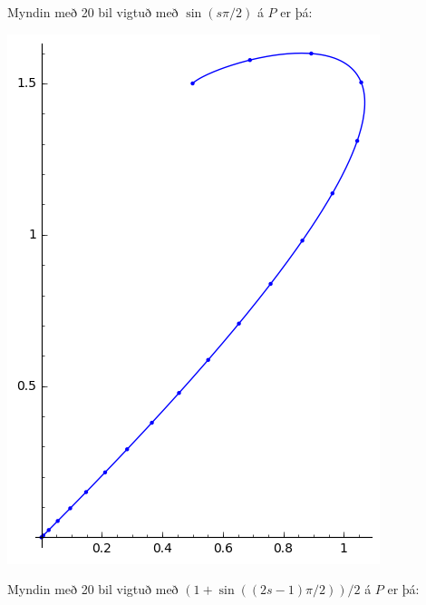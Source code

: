 \documentclass{article}
\begin{document}
\vspace*{0.5cm}

Myndin með 20 bil vigtuð með $\sin(s \pi / 2)$ á $P$ er þá: \\

\begin{center}
\includegraphics[scale=0.7]{20pt3}
\end{center}

\vspace*{0.5cm}

Myndin með 20 bil vigtuð með $(1 + \sin((2s - 1) \pi / 2)) / 2$ á $P$ er þá: \\
\end{document}
